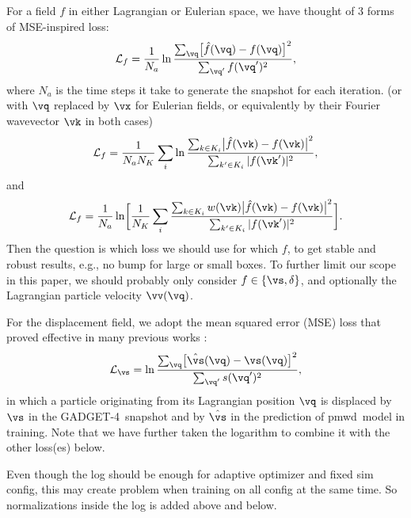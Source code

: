 \documentclass[modern, trackchanges, dvipsnames]{aastex631}
\newcommand{\pmwd}{{\usefont{T1}{nova}{m}{sl}pmwd}}
\newcommand{\GADGET}{{{\fontsize{10pt}{12pt}\selectfont GADGET}-4}}
\newcommand{\cL}{\mathcal{L}}
\newcommand{\YL}[1]{\textcolor{Bittersweet}{#1}}
\begin{document}
\YL{
For a field $f$ in either Lagrangian or Eulerian space, we have thought
of 3 forms of MSE-inspired loss:
%
\begin{equation}
\cL_f = \frac1{N_a} \ln
  \frac{\sum_\vq \bigl[ \hat f(\vq) - f(\vq) \bigr]^2}
       {\sum_{\vq'} f(\vq')^2},
\end{equation}
%
where $N_a$ is the time steps it take to generate the snapshot for each
iteration.
(or with $\vq$ replaced by $\vx$ for Eulerian fields, or equivalently by
their Fourier wavevector $\vk$ in both cases)
%
\begin{equation}
\cL_f = \frac1{N_a N_K} \sum_i \ln
\frac{\sum_{k \in K_i} \bigl| \hat f(\vk) - f(\vk) \bigr|^2}
     {\sum_{k' \in K_i} | f(\vk')|^2},
\end{equation}
%
and
%
\begin{equation}
\cL_f = \frac1{N_a} \ln \biggl[ \frac1{N_K} \sum_i
\frac{\sum_{k \in K_i} w(\vk)
      \bigl| \hat f(\vk) - f(\vk) \bigr|^2}
     {\sum_{k' \in K_i} |f(\vk')|^2} \biggl].
\end{equation}
%
Then the question is which loss we should use for which $f$, to get
stable and robust results, e.g., no bump for large or small boxes.
To further limit our scope in this paper, we should probably only
consider $f \in \{\vs, \delta\}$, and optionally the Lagrangian particle
velocity $\vv(\vq)$.
}

For the displacement field, we adopt the mean squared error (MSE) loss
that proved effective in many previous works
\citep[e.g.,][]{HeEtAl2019, LiEtAl2021}:
%
\begin{equation}
\cL_\vs = \ln \frac{\sum_\vq \bigl[ \hat\vs(\vq) - \vs(\vq) \bigr]^2}
                   {\sum_{\vq'} s(\vq')^2},
\end{equation}
%
in which a particle originating from its Lagrangian position $\vq$ is
displaced by $\vs$ in the \GADGET\ snapshot and by $\hat\vs$ in the
prediction of \pmwd\ model in training.
Note that we have further taken the logarithm to combine it with the
other loss(es) below.

\YL{Even though the log should be enough for adaptive optimizer and
fixed sim config, this may create problem when training on all config at
the same time. So normalizations inside the log is added above and
below.}
\end{document}
